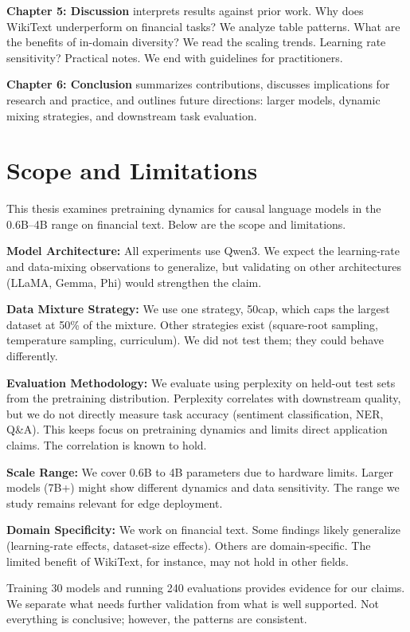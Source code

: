 \textbf{Chapter 5: Discussion} interprets results against prior work. Why does WikiText underperform on financial tasks? We analyze table patterns. What are the benefits of in-domain diversity? We read the scaling trends. Learning rate sensitivity? Practical notes. We end with guidelines for practitioners.

\textbf{Chapter 6: Conclusion} summarizes contributions, discusses implications for research and practice, and outlines future directions: larger models, dynamic mixing strategies, and downstream task evaluation.

\section{Scope and Limitations}

This thesis examines pretraining dynamics for causal language models in the 0.6B--4B range on financial text. Below are the scope and limitations.

\textbf{Model Architecture:} All experiments use Qwen3. We expect the learning-rate and data-mixing observations to generalize, but validating on other architectures (LLaMA, Gemma, Phi) would strengthen the claim.

\textbf{Data Mixture Strategy:} We use one strategy, 50cap, which caps the largest dataset at 50\% of the mixture. Other strategies exist (square-root sampling, temperature sampling, curriculum). We did not test them; they could behave differently.

\textbf{Evaluation Methodology:} We evaluate using perplexity on held-out test sets from the pretraining distribution. Perplexity correlates with downstream quality, but we do not directly measure task accuracy (sentiment classification, NER, Q\&A). This keeps focus on pretraining dynamics and limits direct application claims. The correlation is known to hold.

\textbf{Scale Range:} We cover 0.6B to 4B parameters due to hardware limits. Larger models (7B+) might show different dynamics and data sensitivity. The range we study remains relevant for edge deployment.

\textbf{Domain Specificity:} We work on financial text. Some findings likely generalize (learning-rate effects, dataset-size effects). Others are domain-specific. The limited benefit of WikiText, for instance, may not hold in other fields.

Training 30 models and running 240 evaluations provides evidence for our claims. We separate what needs further validation from what is well supported. Not everything is conclusive; however, the patterns are consistent.
